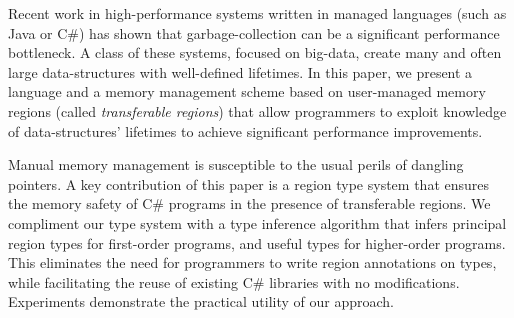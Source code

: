 Recent work in high-performance systems written in managed languages
(such as Java or C\#) has shown that garbage-collection can be a
significant performance bottleneck.  A class of these systems, focused
on big-data, create many and often large data-structures with
well-defined lifetimes.  In this paper, we present a language and a
memory management scheme based on user-managed memory regions (called
\emph{transferable regions}) that allow programmers to exploit
knowledge of data-structures' lifetimes to achieve significant
performance improvements.

Manual memory management is susceptible to the usual perils of
dangling pointers.  A key contribution of this paper is a region type
system that ensures the memory safety of C\# programs in the presence
of transferable regions. We compliment our type system with a type
inference algorithm that infers principal region types for first-order
programs, and useful types for higher-order programs. This eliminates
the need for programmers to write region annotations on types, while
facilitating the reuse of existing C\# libraries with no
modifications. Experiments demonstrate the practical utility of our
approach.

